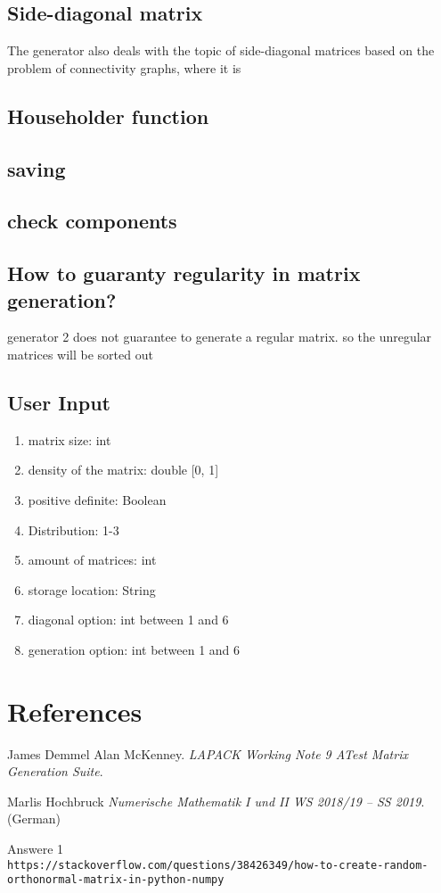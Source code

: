 \documentclass[a4paper]{article}
\begin{document}
\subsection{Side-diagonal matrix}
The generator also deals with the topic of side-diagonal matrices based on the problem of connectivity graphs, where it is

\subsection{Householder function}

\subsection{saving}

\subsection{check components}

\subsection{How to guaranty regularity in matrix generation?}
generator 2 does not guarantee to generate a regular matrix. so the unregular matrices will be sorted out

\subsection{User Input}
\begin{enumerate}
	\item matrix size: int
	\item density of the matrix: double [0, 1]
	\item positive definite: Boolean
	\item Distribution: 1-3
	\item amount of matrices: int
	\item storage location: String
	\item diagonal option: int between 1 and 6
	\item generation option: int between 1 and 6
\end{enumerate}

\newpage

\section{References}
\begin{thebibliography}{9}
	James Demmel Alan McKenney. 
	\textit{LAPACK Working Note 9 ATest Matrix Generation Suite}. 
	
	Marlis Hochbruck
	\textit{Numerische Mathematik I und II WS 2018/19 – SS 2019}. (German)  
	
	Answere 1
	\\\texttt{https://stackoverflow.com/questions/38426349/how-to-create-random-orthonormal-matrix-in-python-numpy}
\end{thebibliography}
\end{document}
